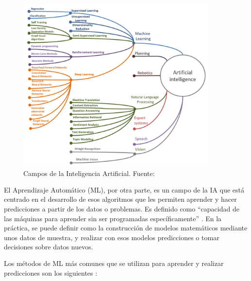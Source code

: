\documentclass[12pt]{report} %
\begin{document}
\begin{figure}[h]
	\centering
	\includegraphics[width=0.9\textwidth]{sectionsAI.png}
	\caption{Campos de la Inteligencia Artificial. Fuente: \cite{artInt}}
	\label{fig:imagen23}
\end{figure}

El Aprendizaje Automático (ML), por otra parte, es un campo de la IA que está centrado en el desarrollo de esos algoritmos que les permiten aprender y hacer predicciones a partir de los datos o problemas. Es definido como “capacidad de las máquinas para aprender sin ser programadas específicamente” \cite{deepLearning}. En la práctica, se puede definir como la construcción de modelos matemáticos mediante unos datos de muestra, y realizar con esos modelos predicciones o tomar decisiones sobre datos nuevos. 
\cite{deepLearning}

Los métodos de ML más comunes que se utilizan para aprender y realizar predicciones son los siguientes 
\cite{deepLearning} \cite{artInt}:
\end{document}
